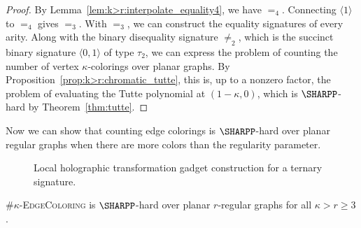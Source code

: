 \documentclass[11pt]{article}
\def\borderColor{blue!60}
\def\scale{0.6}
\def\nodeDist{1.4cm}
\begin{document}
\begin{proof}
 By Lemma~\ref{lem:k>r:interpolate_equality4},
 we have $=_4$.
 Connecting $\langle 1 \rangle$ to $=_4$ gives $=_3$.
 With $=_3$,
 we can construct the equality signatures of every arity.
 Along with the binary disequality signature $\ne_2$,
 which is the succinct binary signature $\langle 0,1 \rangle$ of type $\tau_2$,
 we can express the problem of counting the number of vertex $\kappa$-colorings over planar graphs.
 By Proposition~\ref{prop:k>r:chromatic_tutte},
 this is, up to a nonzero factor, the problem of evaluating the Tutte polynomial at $(1 - \kappa, 0)$,
 which is $\SHARPP$-hard by Theorem~\ref{thm:tutte}.
\end{proof}

Now we can show that counting edge colorings is $\SHARPP$-hard over planar regular graphs when there are more colors than the regularity parameter.

\begin{figure}[t]
 \centering
 \caption{Local holographic transformation gadget construction for a ternary signature.}
 \label{fig:gadget:k>r:local_holographic_transformation}
\end{figure}

\begin{theorem} \label{thm:edge_coloring:k>r}
 \#$\kappa$-\textsc{EdgeColoring} is $\SHARPP$-hard over planar $r$-regular graphs for all $\kappa > r \ge 3$.
\end{theorem}
\end{document}
